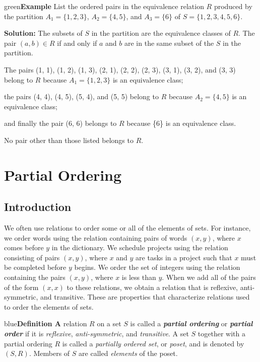 \documentclass[11pt]{article}
\newenvironment{example}[1][\unskip]{\begin{mybox}{green}{\textbf{Example} {#1}}}{\end{mybox}}
\newenvironment{definition}[1]{\begin{mybox}{blue}{\textbf{Definition #1}}}{\end{mybox}}
\begin{document}
\begin{example}
List the ordered pairs in the equivalence relation $R$ produced by the partition $A_1 = \{1, 2, 3\}$, $A_2 = \{4, 5\}$, and $A_3 = \{6\}$ of $S = \{1, 2, 3, 4, 5, 6\}$.

\textbf{Solution:}
The subsets of $S$ in the partition are the equivalence classes of $R$. The pair $(a, b) \in R$ if and only if $a$ and $b$ are in the same subset of the $S$ in the partition. 

The pairs (1, 1), (1, 2), (1, 3), (2, 1), (2, 2), (2, 3), (3, 1), (3, 2), and (3, 3) belong to $R$ because $A_1 = \{1, 2, 3\}$ is an equivalence class; 

the pairs (4, 4), (4, 5), (5, 4), and (5, 5) belong to $R$ because $A_2 = \{4, 5\}$ is an equivalence class; 

and finally the pair (6, 6) belongs to $R$ because \{6\} is an equivalence class. 

No pair other than those listed belongs to $R$.
\end{example}


\section{Partial Ordering}

\subsection{Introduction}

We often use relations to order some or all of the elements of sets. For instance, we order words using the relation containing pairs of words $(x, y)$, where $x$ comes before $y$ in the dictionary. We schedule projects using the relation consisting of pairs $(x, y)$, where $x$ and $y$ are tasks in a project such that $x$ must be completed before $y$ begins. We order the set of integers using the relation containing the pairs $(x, y)$, where $x$ is less than $y$. When we add all of the pairs of the form $(x, x)$ to these relations, we obtain a relation that is reflexive, anti-symmetric, and transitive. These are properties that characterize relations used to order the elements of sets.

\begin{definition}{1}
A relation $R$ on a set $S$ is called a \textbf{\textit{partial ordering}} or \textbf{\textit{partial order}} if it is \textit{reflexive}, \textit{anti-symmetric}, and \textit{transitive}. A set $S$ together with a partial ordering $R$ is called a \textit{partially ordered set}, or \textit{poset}, and is denoted by $(S, R)$. Members of $S$ are called \textit{elements} of the poset.
\end{definition}
\end{document}
